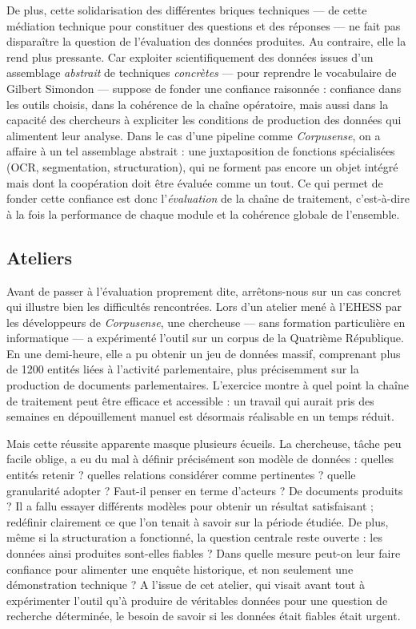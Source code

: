 De plus, cette solidarisation des différentes briques techniques — de cette médiation technique pour constituer des questions et des réponses — ne fait pas disparaître la question de l’évaluation des données produites. Au contraire, elle la rend plus pressante. Car exploiter scientifiquement des données issues d’un assemblage \emph{abstrait} de techniques \emph{concrètes} — pour reprendre le vocabulaire de Gilbert Simondon — suppose de fonder une confiance raisonnée : confiance dans les outils choisis, dans la cohérence de la chaîne opératoire, mais aussi dans la capacité des chercheurs à expliciter les conditions de production des données qui alimentent leur analyse. Dans le cas d’une pipeline comme \emph{Corpusense}, on a affaire à un tel assemblage abstrait : une juxtaposition de fonctions spécialisées (OCR, segmentation, structuration), qui ne forment pas encore un objet intégré mais dont la coopération doit être évaluée comme un tout. Ce qui permet de fonder cette confiance est donc l’\emph{évaluation} de la chaîne de traitement, c’est-à-dire à la fois la performance de chaque module et la cohérence globale de l’ensemble.

\subsection{Ateliers}

Avant de passer à l’évaluation proprement dite, arrêtons-nous sur un cas concret qui illustre bien les difficultés rencontrées. Lors d’un atelier mené à l'EHESS par les développeurs de \emph{Corpusense}, une chercheuse — sans formation particulière en informatique — a expérimenté l’outil sur un corpus de la Quatrième République. En une demi-heure, elle a pu obtenir un jeu de données massif, comprenant plus de 1200 entités liées à l’activité parlementaire, plus précisemment sur la production de documents parlementaires. L’exercice montre à quel point la chaîne de traitement peut être efficace et accessible : un travail qui aurait pris des semaines en dépouillement manuel est désormais réalisable en un temps réduit.

Mais cette réussite apparente masque plusieurs écueils. La chercheuse, tâche peu facile oblige, a eu du mal à définir précisément son modèle de données : quelles entités retenir ? quelles relations considérer comme pertinentes ? quelle granularité adopter ? Faut-il penser en terme d'acteurs ? De documents produits ? Il a fallu essayer différents modèles pour obtenir un résultat satisfaisant ; redéfinir clairement ce que l'on tenait à savoir sur la période étudiée. De plus, même si la structuration a fonctionné, la question centrale reste ouverte : les données ainsi produites sont-elles fiables ? Dans quelle mesure peut-on leur faire confiance pour alimenter une enquête historique, et non seulement une démonstration technique ? A l'issue de cet atelier, qui visait avant tout à expérimenter l'outil qu'à produire de véritables données pour une question de recherche déterminée, le besoin de savoir si les données était fiables était urgent.

